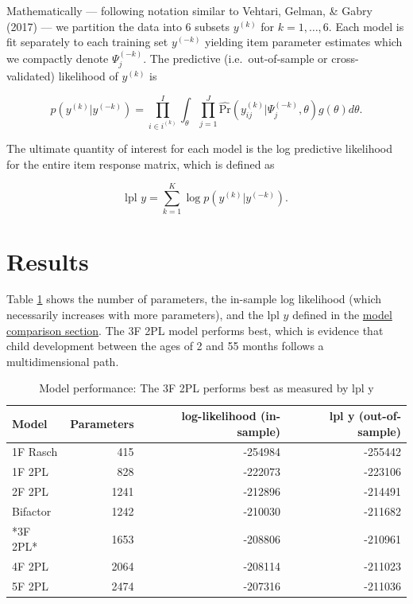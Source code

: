 \documentclass[10pt, letterpaper]{article}
\newenvironment{CodeChunk}{}{}
\begin{document}
Mathematically --- following notation similar to Vehtari, Gelman, \&
Gabry (2017) --- we partition the data into 6 subsets \(y^{(k)}\) for
\(k = 1, \dots, 6\). Each model is fit separately to each training set
\(y^{(-k)}\) yielding item parameter estimates which we compactly denote
\(\Psi_j^{(-k)}\). The predictive (i.e.~out-of-sample or
cross-validated) likelihood of \(y^{(k)}\) is

\[
p(y^{(k)} | y^{(-k)}) = \prod_{i \in i^{(k)}}^{I} \int_\theta \prod_{j=1}^{J} \hat{\text{Pr}}(y_{ij}^{(k)} | \Psi_j^{(-k)}, \theta) g(\theta)d\theta.
\]

The ultimate quantity of interest for each model is the log predictive
likelihood for the entire item response matrix, which is defined as

\[
\text{lpl } y = \sum_{k = 1}^{K} \log p(y^{(k)} | y^{(-k)}).
\]

\hypertarget{results}{%
\section{Results}\label{results}}

Table \ref{tab:results} shows the number of parameters, the in-sample
log likelihood (which necessarily increases with more parameters), and
the \(\text{lpl } y\) defined in the
\protect\hyperlink{modelcompare}{model comparison section}. The 3F 2PL
model performs best, which is evidence that child development between
the ages of 2 and 55 months follows a multidimensional path.

\begin{CodeChunk}
\begin{table}[!h]

\caption{\label{tab:results}Model performance: The 3F 2PL performs best as measured by lpl y}
\centering
\fontsize{8}{10}\selectfont
\begin{tabular}[t]{lrrr}
\toprule
Model & Parameters & log-likelihood (in-sample) & lpl y (out-of-sample)\\
\midrule
1F Rasch & 415 & -254984 & -255442\\
1F 2PL & 828 & -222073 & -223106\\
2F 2PL & 1241 & -212896 & -214491\\
Bifactor & 1242 & -210030 & -211682\\
*3F 2PL* & 1653 & -208806 & -210961\\
4F 2PL & 2064 & -208114 & -211023\\
5F 2PL & 2474 & -207316 & -211036\\
\bottomrule
\end{tabular}
\end{table}

\end{CodeChunk}
\end{document}

